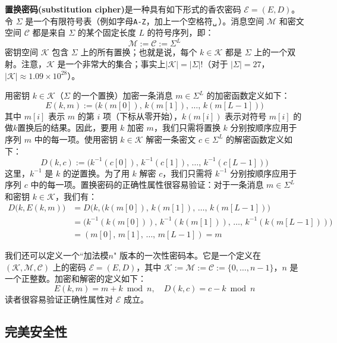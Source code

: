 \begin{example}\label{exmp:2-3}
\textbf{置换密码(substitution cipher)}是一种具有如下形式的香农密码 $\mathcal{E}=(E,D)$。令 $\Sigma$ 是一个有限符号表（例如字母\texttt{A-Z}，加上一个空格符\texttt{␣}\,）。消息空间 $\mathcal{M}$ 和密文空间 $\mathcal{C}$ 都是来自 $\Sigma$ 的某个固定长度 $L$ 的符号序列，即：
\[
\mathcal{M}:=\mathcal{C}:=\Sigma^L
\]
密钥空间 $\mathcal{K}$ 包含 $\Sigma$ 上的所有置换；也就是说，每个 $k\in\mathcal{K}$ 都是 $\Sigma$ 上的一个双射。注意，$\mathcal{K}$ 是一个非常大的集合；事实上$|\mathcal{K}|=|\Sigma|!$（对于 $|\Sigma|=27$，$|\mathcal{K}|\approx 1.09\times10^{28}$）。

用密钥 $k\in\mathcal{K}$（$\Sigma$ 的一个置换）加密一条消息 $m\in\Sigma^L$ 的加密函数定义如下：
\[
E(k,m):=\big(k(m[0]),\,k(m[1]),\,\dots,\,k(m[L-1])\big)
\]
其中 $m[i]$ 表示 $m$ 的第 $i$ 项（下标从零开始），$k(m[i])$ 表示对符号 $m[i]$ 的做$k$置换后的结果。因此，要用 $k$ 加密 $m$，我们只需将置换 $k$ 分别按顺序应用于序列 $m$ 中的每一项。使用密钥 $k\in\mathcal{K}$ 解密一条密文 $c\in\Sigma^L$ 的解密函数定义如下：
\[
D(k,c):=\big(k^{-1}(c[0]),\,k^{-1}(c[1]),\,\dots,\,k^{-1}(c[L-1])\big)
\]
这里，$k^{-1}$ 是 $k$ 的逆置换。为了用 $k$ 解密 $c$，我们只需将 $k^{-1}$ 分别按顺序应用于序列 $c$ 中的每一项。置换密码的正确性属性很容易验证：对于一条消息 $m\in\Sigma^L$ 和密钥 $k\in\mathcal{K}$，我们有：
\[
\begin{aligned}
D\big(k,E(k,m)\big)
&=D\big(k,(k(m[0]),\,k(m[1]),\,\dots,\,k(m[L−1])\big)\\
&=\big(k^{−1}(k(m[0])),\,k^{−1}(k(m[1])),\,\dots,\,k^{−1}(k(m[L−1]))\big)\\
& =(m[0],\,m[1],\,\dots,\,m[L−1])=m
\end{aligned}
\]
\end{example}

\begin{example}[加性一次性密码本]\label{exmp:2-4}
我们还可以定义一个``加法模$n$" 版本的一次性密码本。它是一个定义在 $(\mathcal{K},\mathcal{M},\mathcal{C})$ 上的密码 $\mathcal{E}=(E,D)$，其中 $\mathcal{K}:=\mathcal{M}:=\mathcal{C}:=\{0,\dots,n-1\}$，$n$ 是一个正整数。加密和解密的定义如下：
\[
E(k,m)=m+k \bmod n,
\quad
D(k,c)=c-k \bmod n
\]
读者很容易验证正确性属性对 $\mathcal{E}$ 成立。
\end{example}

\subsection{完美安全性}\label{subsec:2-1-2}

